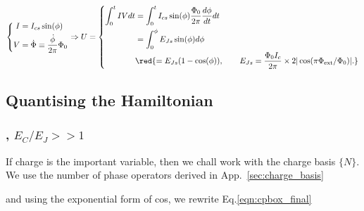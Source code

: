 \begin{itemize}
	\begin{equation}
	\left\lbrace\begin{aligned}
	I &= I_{cs}\sin(\phi)\\
	V&=\dot{\Phi} \equiv \frac{\dot{\phi}}{2\pi}\Phi_0
	\end{aligned}\right. \Rightarrow U = \left\lbrace\begin{aligned}
	\int_{0}^{t}IV dt & = \int_{0}^{t}I_{cs}\sin(\phi)\frac{\Phi_0}{2\pi}\frac{d\phi}{dt}dt\\
	& = \int_{0}^{\phi} E_{Js}\sin(\phi)d\phi\\
	& \red{= E_{Js}(1-\cos(\phi)),\qquad E_{Js} = \frac{\Phi_0I_c}{2\pi}\times 2|\cos(\pi\Phi_\text{ext}/\Phi_0)|.}
	\end{aligned}\right.
	\end{equation} 
 \end{itemize}

\newpage \subsection{Quantising the Hamiltonian}   
 \subsubsection{, $ E_C/E_J >> 1$}
  If charge is the important variable, then we chall work with the charge basis $ \lbrace N \rbrace $. We use the number of phase operators derived in App.~\ref{sec:charge_basis}
  
 
   \noindent and using the exponential form of cos, we rewrite Eq.\eqref{eqn:cpbox_final}

